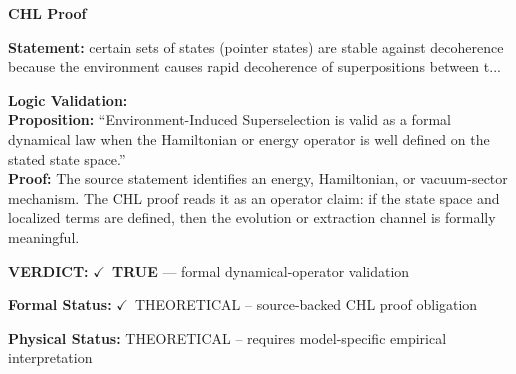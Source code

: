 \vspace{0.45em}
\noindent\textbf{CHL Proof}\par
\textbf{Statement:} certain sets of states (pointer states) are stable against decoherence because the
environment causes rapid decoherence of superpositions between t...

\textbf{Logic Validation:}\\
\textbf{Proposition:} ``Environment-Induced Superselection is valid as a formal dynamical law when the
Hamiltonian or energy operator is well defined on the stated state space.''\\
\textbf{Proof:} The source statement identifies an energy, Hamiltonian, or vacuum-sector mechanism. The
CHL proof reads it as an operator claim: if the state space and localized terms are
defined, then the evolution or extraction channel is formally meaningful.

\textbf{VERDICT:} \ensuremath{\checkmark}\ \textbf{TRUE} --- formal dynamical-operator validation

\textbf{Formal Status:} \ensuremath{\checkmark}\ THEORETICAL -- source-backed CHL proof obligation

\textbf{Physical Status:} THEORETICAL -- requires model-specific empirical interpretation
\par\vspace{0.45em}
\par
\ifTZPDarkEdition
{}
\fi
\endgroup
\endgroup
